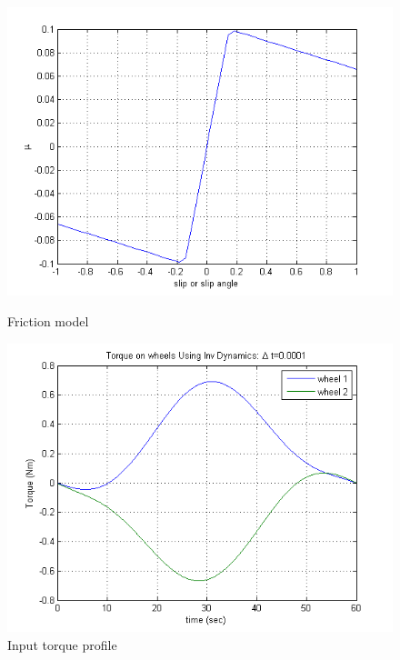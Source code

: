\begin{figure}
	\begin{minipage}[t]{0.5\textwidth}
		\centering
		\includegraphics[width=\textwidth]{Chapter4/fig/frictionVsSlip}
		\caption{Friction model}\label{fig:friction_Slip}
	\end{minipage}
	\hfill
	\begin{minipage}[t]{0.5\textwidth}
		\centering
		\includegraphics[width=\textwidth]{Chapter4/fig/InputTorqueProfile}
		\caption{Input torque profile }\label{fig:InputTorqueProfile}
	\end{minipage}
\end{figure}
\ 
